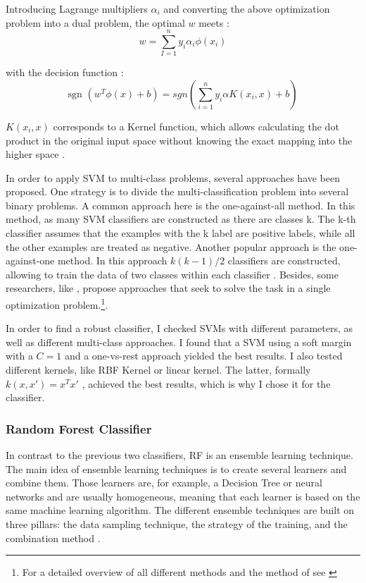 \documentclass[12pt, a4paper, titlepage]{article}
\begin{document}
Introducing Lagrange multipliers $\alpha_i$ and converting the above optimization problem into a dual problem, the optimal $w$ meets \citep{Chang2001, Jordan2006}:
\[w = \sum_{I=1}^n y_i\alpha_i\phi(x_i)\]

with the decision function \citep{Chang2001}:
\[\text{sgn } (w^T\phi(x)+b) = sgn(\sum_{i=1}^n y_i \alpha K(x_i, x) +b)\]

$K(x_i, x)$ corresponds to a Kernel function, which allows calculating the dot product in the original input space without knowing the exact mapping into the higher space \citep{Han2012, Jordan2006}. 

In order to apply \ac{SVM} to multi-class problems, several approaches have been proposed. One strategy is to divide the multi-classification problem into several binary problems. A common approach here is the one-against-all method. In this method, as many \ac{SVM} classifiers are constructed as there are classes k. The k-th classifier assumes that the examples with the k label are positive labels, while all the other examples are treated as negative. Another popular approach is the one-against-one method. In this approach $k(k-1)/2$ classifiers are constructed, allowing to train the data of two classes within each classifier \citep{Hsu2002}. Besides, some researchers, like \citet{Crammer2001}, propose approaches that seek to solve the task in a single optimization problem.\footnote{For a detailed overview of all different methods and the method of \citet{Crammer2001} see \citet{Hsu2002,Crammer2001}}. 

In order to find a robust classifier, I checked \ac{SVM}s with different parameters, as well as different multi-class approaches. I found that a \ac{SVM} using a soft margin with a $C=1$ and a one-vs-rest approach yielded the best results. I also tested different kernels, like  RBF Kernel or linear kernel. The latter, formally  $k(x, x') = x^Tx'$ \citep{Jordan2006}, achieved the best results, which is why I chose it for the classifier. 

\subsubsection{Random Forest Classifier}
In contrast to the previous two classifiers, \ac{RF} is an ensemble learning technique. The main idea of ensemble learning techniques is to create several learners and combine them. Those learners are, for example, a Decision Tree or neural networks and are usually homogeneous, meaning that each learner is based on the same machine learning algorithm. The different ensemble techniques are built on three pillars: the data sampling technique, the strategy of the training, and the combination method \citep{polikar2012, zhou2009}. 
\end{document}
